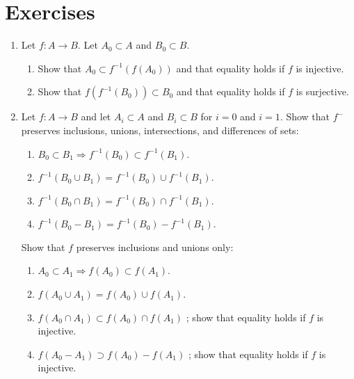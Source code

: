 \section*{Exercises}
\begin{enumerate}[itemsep=0.4em, parsep=0pt, topsep=0pt, partopsep=0pt, leftmargin=*, label=\arabic*., ref=\arabic*]
\item Let \(f : A \rightarrow B\). Let \(A_{0} \subset A\) and \(B_{0} \subset B\).
  \begin{enumerate}[itemsep=0.2em, parsep=0pt, topsep=0pt, partopsep=0pt, leftmargin=*, label=(\alph*), align=left]
  \item Show that \(A_{0} \subset {f}^{-1}({f(A_{0}) })\) and that equality holds if \(f\) is injective.
  \item Show that \(f({f^{-1}(B_{0}) }) \subset {B}_{0}\) and that equality holds if \(f\) is surjective.
  \end{enumerate}
\item Let \(f : A \rightarrow B\) and let \(A_{i} \subset A\) and \(B_{i} \subset B\) for \(i = 0\) and \(i = 1\). Show that \(f^{ - }\) preserves inclusions, unions, intersections, and differences of sets:
\begin{enumerate}[itemsep=0.2em, parsep=0pt, topsep=0pt, partopsep=0pt, leftmargin=*, label=(\alph*), align=left]
\item \(B_{0} \subset {B}_{1} \Rightarrow {f}^{-1}(B_{0}) \subset {f}^{-1}(B_{1})\).
\item \(f^{-1}({B_{0} \cup {B}_{1}}) = f^{-1}(B_{0}) \cup {f}^{-1}(B_{1})\).
\item \(f^{-1}({B_{0} \cap {B}_{1}}) = f^{-1}(B_{0}) \cap {f}^{-1}(B_{1})\).
\item \(f^{-1}({B_{0} - B_{1}}) = f^{-1}(B_{0}) - f^{-1}(B_{1})\). 
\end{enumerate}
Show that \(f\) preserves inclusions and unions only:
\begin{enumerate}[start=5, itemsep=0.2em, parsep=0pt, topsep=0pt, partopsep=0pt, leftmargin=*, label=(\alph*), align=left]
\item \(A_{0} \subset {A}_{1} \Rightarrow f(A_{0}) \subset f(A_{1})\).
\item \(f({A_{0} \cup {A}_{1}}) = f(A_{0}) \cup f(A_{1})\).
\item \(f({A_{0} \cap {A}_{1}}) \subset f(A_{0}) \cap f(A_{1})\) ; show that equality holds if \(f\) is injective.
\item \(f({A_{0} - A_{1}}) \supset f(A_{0}) - f(A_{1})\) ; show that equality holds if \(f\) is injective.

\end{enumerate}
\end{enumerate}
